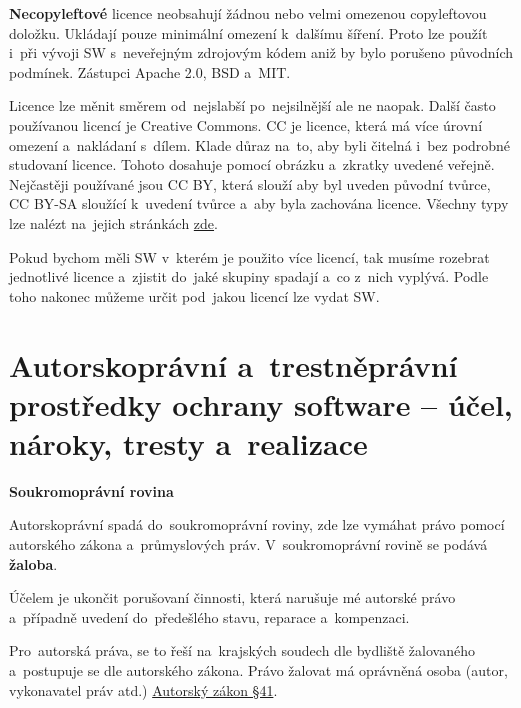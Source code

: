 \textbf{Necopyleftové} licence neobsahují žádnou nebo velmi omezenou copyleftovou doložku. Ukládají pouze minimální omezení k~dalšímu šíření. Proto lze použít i~při vývoji SW s~neveřejným zdrojovým kódem aniž by bylo porušeno původních podmínek. Zástupci Apache 2.0, BSD a~MIT\@.
\vspace{0.2cm}

Licence lze měnit směrem od~nejslabší po~nejsilnější ale ne naopak. Další často používanou licencí je Creative Commons. CC je licence, která má více úrovní omezení a~nakládaní s~dílem. Klade důraz na~to, aby byli čitelná i~bez podrobné studovaní licence. Tohoto dosahuje pomocí obrázku a~zkratky uvedené veřejně. Nejčastěji používané jsou CC BY, která slouží aby byl uveden původní tvůrce, CC BY-SA sloužící k~uvedení tvůrce a~aby byla zachována licence. Všechny typy lze nalézt na~jejich stránkách \href{https://creativecommons.org/licenses/}{zde}.
\vspace{0.2cm}

Pokud bychom měli SW v~kterém je použito více licencí, tak musíme rozebrat jednotlivé licence a~zjistit do~jaké skupiny spadají a~co z~nich vyplývá. Podle toho nakonec můžeme určit pod~jakou licencí lze vydat SW.










\clearpage
\section{Autorskoprávní a~trestněprávní prostředky ochrany software -- účel, nároky, tresty a~realizace}

\begin{Large}
\textbf{Soukromoprávní rovina}
\end{Large}

Autorskoprávní spadá do~soukromoprávní roviny, zde lze vymáhat právo pomocí autorského zákona a~průmyslových práv. V~soukromoprávní rovině se podává \textbf{žaloba}.

Účelem je ukončit porušovaní činnosti, která narušuje mé autorské právo a~případně uvedení do~předešlého stavu, reparace a~kompenzaci.

Pro~autorská práva, se to řeší na~krajských soudech dle bydliště žalovaného a~postupuje se dle autorského zákona. Právo žalovat má oprávněná osoba (autor, vykonavatel práv atd.) \href{https://www.zakonyprolidi.cz/cs/2000-121#p41}{Autorský zákon §41}.

